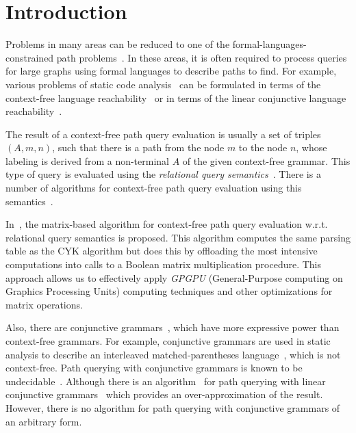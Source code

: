 \section{Introduction}

Problems in many areas can be reduced to one of the formal-languages-constrained path problems~\cite{barrett2000formal}. In these areas, it is often required to process queries for large graphs using formal languages to describe paths to find. For example, various problems of static code analysis~\cite{bastani2015specification,xu2009scaling} can be formulated in terms of the context-free language reachability~\cite{reps1998program} or in terms of the linear conjunctive language reachability~\cite{zhang2017context}.

The result of a context-free path query evaluation is usually a set of triples \mbox{$(A, m, n)$}, such that there is a path from the node $m$ to the node $n$, whose labeling is derived from a non-terminal $A$ of the given context-free grammar. This type of query is evaluated using the \emph{relational query semantics}~\cite{hellingsRelational}. There is a number of algorithms for context-free path query evaluation using this semantics~\cite{azimov2018context,GLL,hellingsRelational,GraphQueryWithEarley,RDF}.

In~\cite{azimov2018context}, the matrix-based algorithm for context-free path query evaluation w.r.t. relational query semantics is proposed. This algorithm computes the same parsing table as the CYK algorithm but does this by offloading the most intensive computations into calls to a Boolean matrix multiplication procedure. This approach allows us to effectively apply \emph{GPGPU} (General-Purpose computing on Graphics Processing Units) computing techniques and other optimizations for matrix operations.

Also, there are conjunctive grammars~\cite{okhotinConjAndBool}, which have more expressive power than context-free grammars. For example, conjunctive grammars are used in static analysis to describe an interleaved matched-parentheses language~\cite{zhang2017context}, which is not context-free. Path querying with conjunctive grammars is known to be undecidable~\cite{hellingsRelational}. Although there is an algorithm~\cite{zhang2017context} for path querying with linear conjunctive grammars~\cite{okhotinConjAndBool} which provides an over-approximation of the result. However, there is no algorithm for path querying with conjunctive grammars of an arbitrary form.

